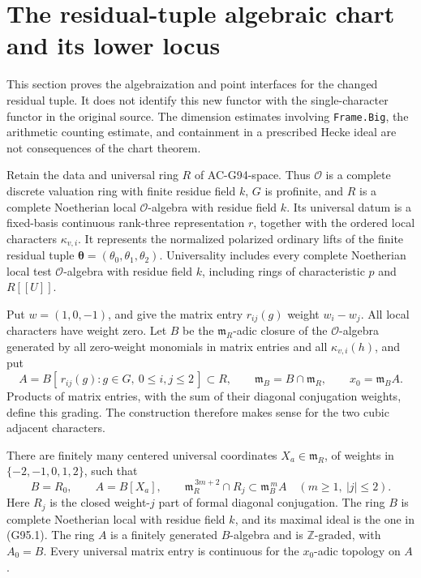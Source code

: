 \section{The residual-tuple algebraic chart and its lower locus}
\label{sec:residual-tuple-algebraic-chart}

This section proves the algebraization and point interfaces for the
changed residual tuple.  It does not identify this new functor with the
single-character functor in the original source.  The dimension
estimates involving \texttt{Frame.Big}, the arithmetic counting
estimate, and containment in a prescribed Hecke ideal are not
consequences of the chart theorem.

Retain the data and universal ring \(R\) of AC-G94-space.  Thus
\(\mathcal O\) is a complete discrete valuation ring with finite residue
field \(k\), \(G\) is profinite, and \(R\) is a complete Noetherian local
\(\mathcal O\)-algebra with residue field \(k\).  Its universal datum is a
fixed-basis continuous rank-three representation \(r\), together with
the ordered local characters \(\kappa_{v,i}\).  It represents the
normalized polarized ordinary lifts of the finite residual tuple
\(\boldsymbol\theta=(\theta_0,\theta_1,\theta_2)\).
Universality includes every complete Noetherian local test
\(\mathcal O\)-algebra with residue field \(k\), including rings of
characteristic \(p\) and \(R[[U]]\).

Put \(w=(1,0,-1)\), and give the matrix entry \(r_{ij}(g)\) weight
\(w_i-w_j\).  All local characters have weight zero.  Let \(B\) be the
\(\mathfrak m_R\)-adic closure of the \(\mathcal O\)-algebra generated by
all zero-weight monomials in matrix entries and all
\(\kappa_{v,i}(h)\), and put
\[
 A=B[\,r_{ij}(g):g\in G,\ 0\leq i,j\leq2\,]\subset R,\qquad
 \mathfrak m_B=B\cap\mathfrak m_R,\qquad x_0=\mathfrak m_B A.
 \tag{G95.1}
\]
Products of matrix entries, with the sum of their diagonal conjugation
weights, define this grading.  The construction therefore makes sense
for the two cubic adjacent characters.

\begin{theorem}
\label{AC-G95-algebra}
There are finitely many centered universal coordinates \(X_a\in
\mathfrak m_R\), of weights in \(\{-2,-1,0,1,2\}\), such that
\[
 B=R_0,\qquad A=B[X_a],\qquad
 \mathfrak m_R^{\,3m+2}\cap R_j\subset\mathfrak m_B^{\,m}A
       \quad(m\geq1,\ |j|\leq2).
 \tag{G95.2}
\]
Here \(R_j\) is the closed weight-\(j\) part of formal diagonal
conjugation.  The ring \(B\) is complete Noetherian local with residue
field \(k\), and its maximal ideal is the one in (G95.1).
The ring \(A\) is a finitely generated \(B\)-algebra and is
\(\mathbb Z\)-graded, with \(A_0=B\).
Every universal matrix entry is continuous for the \(x_0\)-adic
topology on \(A\).
\end{theorem}

